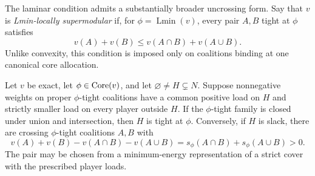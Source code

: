 The laminar condition admits a substantially broader uncrossing form.  Say
that $v$ is \emph{Lmin-locally supermodular} if, for
$\phi=\operatorname{Lmin}(v)$, every pair $A,B$ tight at $\phi$ satisfies
\[
 v(A)+v(B)\leq v(A\cap B)+v(A\cup B).                \tag{LSM}
 \label{eq:lx-local-supermodularity}
\]
Unlike convexity, this condition is imposed only on coalitions binding at one
canonical core allocation.

\begin{theorem}
\label{thm:lx-local-supermodular-domain}
Let $v$ be exact, let $\phi\in\operatorname{Core}(v)$, and let
$\varnothing\ne H\subsetneq N$.  Suppose nonnegative weights on proper
$\phi$-tight coalitions have a common positive load on $H$ and strictly
smaller load on every player outside $H$.  If the $\phi$-tight family is
closed under union and intersection, then $H$ is tight at $\phi$.
Conversely, if $H$ is slack, there are crossing $\phi$-tight coalitions $A,B$
with
\[
 v(A)+v(B)-v(A\cap B)-v(A\cup B)
 =s_\phi(A\cap B)+s_\phi(A\cup B)>0.                 \tag{UD}
 \label{eq:lx-uncrossing-defect}
\]
The pair may be chosen from a minimum-energy representation of a strict
cover with the prescribed player loads.
\end{theorem}

